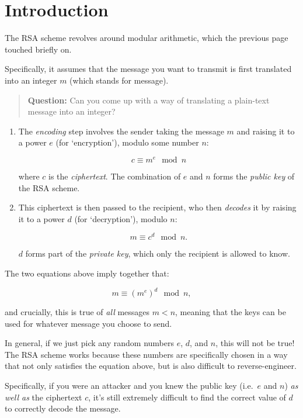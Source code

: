 \documentclass[
  letterpaper,
  DIV=11,
  numbers=noendperiod]{scrreprt}
\begin{document}
\hypertarget{introduction-3}{%
\section{Introduction}\label{introduction-3}}

The RSA scheme revolves around modular arithmetic, which the previous
page touched briefly on.

Specifically, it assumes that the message you want to transmit is first
translated into an integer \(m\) (which stands for message).

\begin{quote}
\textbf{Question:} Can you come up with a way of translating a
plain-text message into an integer?
\end{quote}

\begin{enumerate}
\def\labelenumi{\arabic{enumi}.}
\item
  The \emph{encoding} step involves the sender taking the message \(m\)
  and raising it to a power \(e\) (for `encryption'), modulo some number
  \(n\):

  \[c \equiv m^e \mod n\]

  where \(c\) is the \emph{ciphertext}. The combination of \(e\) and
  \(n\) forms the \emph{public key} of the RSA scheme.
\item
  This ciphertext is then passed to the recipient, who then
  \emph{decodes} it by raising it to a power \(d\) (for `decryption'),
  modulo \(n\):

  \[m \equiv c^d \mod n.\]

  \(d\) forms part of the \emph{private key}, which only the recipient
  is allowed to know.
\end{enumerate}

The two equations above imply together that:

\[m \equiv (m^e)^d \mod n,\]

and crucially, this is true of \emph{all} messages \(m < n\), meaning
that the keys can be used for whatever message you choose to send.

In general, if we just pick any random numbers \(e\), \(d\), and \(n\),
this will not be true! The RSA scheme works because these numbers are
specifically chosen in a way that not only satisfies the equation above,
but is also difficult to reverse-engineer.

Specifically, if you were an attacker and you knew the public key
(i.e.~\(e\) and \(n\)) \emph{as well as} the ciphertext \(c\), it's
still extremely difficult to find the correct value of \(d\) to
correctly decode the message.
\end{document}
